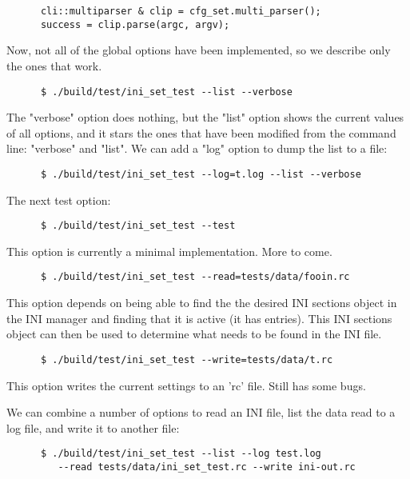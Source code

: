    \begin{verbatim}
      cli::multiparser & clip = cfg_set.multi_parser();
      success = clip.parse(argc, argv);
   \end{verbatim}

   Now, not all of the global options have been implemented, so we describe
   only the ones that work.

   \begin{verbatim}
      $ ./build/test/ini_set_test --list --verbose
   \end{verbatim}

   The "verbose" option does nothing, but the "list" option shows
   the current values of all options, and it stars the ones that
   have been modified from the command line: "verbose" and "list".
   We can add a "log" option to dump the list to a file:

   \begin{verbatim}
      $ ./build/test/ini_set_test --log=t.log --list --verbose
   \end{verbatim}

   The next test option:

   \begin{verbatim}
      $ ./build/test/ini_set_test --test
   \end{verbatim}

   This option is currently a minimal implementation. More to come.

   \begin{verbatim}
      $ ./build/test/ini_set_test --read=tests/data/fooin.rc
   \end{verbatim}

   This option
   depends on being able to find the the desired INI sections object in the
   INI manager and finding that it is active (it has entries).
   This INI sections object can then be used to determine what needs to
   be found in the INI file.

   \begin{verbatim}
      $ ./build/test/ini_set_test --write=tests/data/t.rc
   \end{verbatim}

   This option writes the current settings to an 'rc' file.
   Still has some bugs.

   We can combine a number of options to read an INI file, list the
   data read to a log file, and write it to another file:

   \begin{verbatim}
      $ ./build/test/ini_set_test --list --log test.log
         --read tests/data/ini_set_test.rc --write ini-out.rc
   \end{verbatim}

